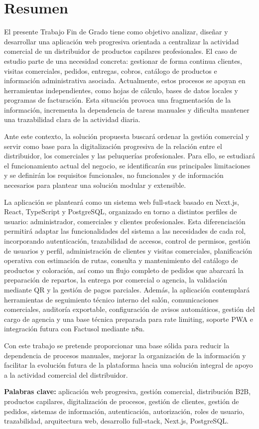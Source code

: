 \newpage{\ } 
\thispagestyle{empty}
\chapter*{Resumen}

El presente Trabajo Fin de Grado tiene como objetivo analizar, diseñar y desarrollar una aplicación web progresiva orientada a centralizar la actividad comercial de un distribuidor de productos capilares profesionales. El caso de estudio parte de una necesidad concreta: gestionar de forma continua clientes, visitas comerciales, pedidos, entregas, cobros, catálogo de productos e información administrativa asociada. Actualmente, estos procesos se apoyan en herramientas independientes, como hojas de cálculo, bases de datos locales y programas de facturación. Esta situación provoca una fragmentación de la información, incrementa la dependencia de tareas manuales y dificulta mantener una trazabilidad clara de la actividad diaria.

Ante este contexto, la solución propuesta buscará ordenar la gestión comercial y servir como base para la digitalización progresiva de la relación entre el distribuidor, los comerciales y las peluquerías profesionales. Para ello, se estudiará el funcionamiento actual del negocio, se identificarán sus principales limitaciones y se definirán los requisitos funcionales, no funcionales y de información necesarios para plantear una solución modular y extensible.

La aplicación se planteará como un sistema web full-stack basado en Next.js, React, TypeScript y PostgreSQL, organizado en torno a distintos perfiles de usuario: administrador, comerciales y clientes profesionales. Esta diferenciación permitirá adaptar las funcionalidades del sistema a las necesidades de cada rol, incorporando autenticación, trazabilidad de accesos, control de permisos, gestión de usuarios y perfil, administración de clientes y visitas comerciales, planificación operativa con estimación de rutas, consulta y mantenimiento del catálogo de productos y coloración, así como un flujo completo de pedidos que abarcará la preparación de repartos, la entrega por comercial o agencia, la validación mediante QR y la gestión de pagos parciales. Además, la aplicación contemplará herramientas de seguimiento técnico interno del salón, comunicaciones comerciales, auditoría exportable, configuración de avisos automáticos, gestión del cargo de agencia y una base técnica preparada para rate limiting, soporte PWA e integración futura con Factusol mediante n8n.

Con este trabajo se pretende proporcionar una base sólida para reducir la dependencia de procesos manuales, mejorar la organización de la información y facilitar la evolución futura de la plataforma hacia una solución integral de apoyo a la actividad comercial del distribuidor.

\vspace{.5cm}

\noindent \textbf{Palabras clave:} aplicación web progresiva, gestión comercial, distribución B2B, productos capilares, digitalización de procesos, gestión de clientes, gestión de pedidos, sistemas de información, autenticación, autorización, roles de usuario, trazabilidad, arquitectura web, desarrollo full-stack, Next.js, PostgreSQL.